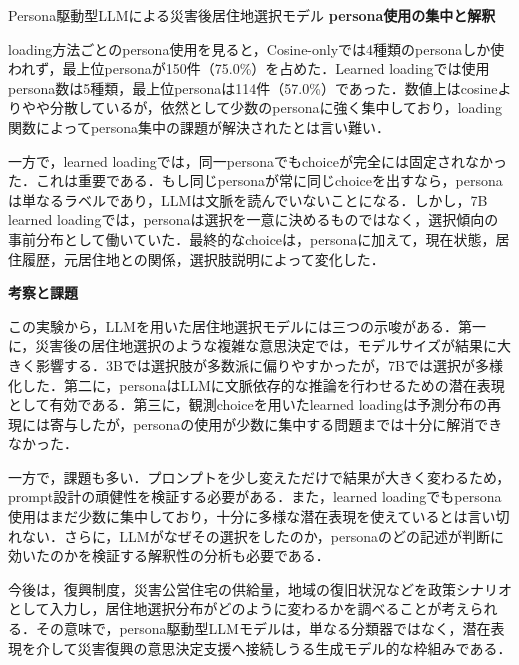 \begin{column}{Persona駆動型LLMによる災害後居住地選択モデル}
\medskip
\noindent
\textbf{persona使用の集中と解釈}

loading方法ごとのpersona使用を見ると，Cosine-onlyでは4種類のpersonaしか使われず，最上位personaが150件（75.0\%）を占めた．Learned loadingでは使用persona数は5種類，最上位personaは114件（57.0\%）であった．数値上はcosineよりやや分散しているが，依然として少数のpersonaに強く集中しており，loading関数によってpersona集中の課題が解決されたとは言い難い．

一方で，learned loadingでは，同一personaでもchoiceが完全には固定されなかった．これは重要である．もし同じpersonaが常に同じchoiceを出すなら，personaは単なるラベルであり，LLMは文脈を読んでいないことになる．しかし，7B learned loadingでは，personaは選択を一意に決めるものではなく，選択傾向の事前分布として働いていた．最終的なchoiceは，personaに加えて，現在状態，居住履歴，元居住地との関係，選択肢説明によって変化した．

\medskip
\noindent
\textbf{考察と課題}

この実験から，LLMを用いた居住地選択モデルには三つの示唆がある．第一に，災害後の居住地選択のような複雑な意思決定では，モデルサイズが結果に大きく影響する．3Bでは選択肢が多数派に偏りやすかったが，7Bでは選択が多様化した．第二に，personaはLLMに文脈依存的な推論を行わせるための潜在表現として有効である．第三に，観測choiceを用いたlearned loadingは予測分布の再現には寄与したが，personaの使用が少数に集中する問題までは十分に解消できなかった．

一方で，課題も多い．プロンプトを少し変えただけで結果が大きく変わるため，prompt設計の頑健性を検証する必要がある．また，learned loadingでもpersona使用はまだ少数に集中しており，十分に多様な潜在表現を使えているとは言い切れない．さらに，LLMがなぜその選択をしたのか，personaのどの記述が判断に効いたのかを検証する解釈性の分析も必要である．

今後は，復興制度，災害公営住宅の供給量，地域の復旧状況などを政策シナリオとして入力し，居住地選択分布がどのように変わるかを調べることが考えられる．その意味で，persona駆動型LLMモデルは，単なる分類器ではなく，潜在表現を介して災害復興の意思決定支援へ接続しうる生成モデル的な枠組みである．
\end{column}
\clearpage
